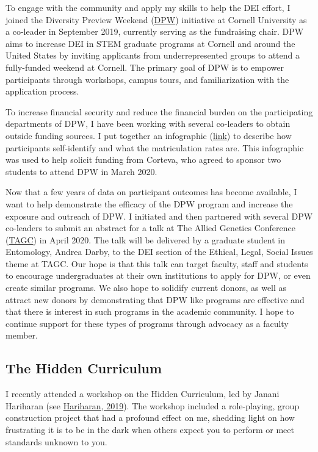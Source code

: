 \documentclass[11pt]{article}
\begin{document}
To engage with the community and apply my skills to help the DEI effort, I joined the Diversity Preview Weekend (\href{https://cornelldpw.org}{DPW}) initiative at Cornell University as a co-leader in September 2019, currently serving as the fundraising chair. DPW aims to increase DEI in STEM graduate programs at Cornell and around the United States by inviting applicants from underrepresented groups to attend a fully-funded weekend at Cornell. The primary goal of DPW is to empower participants through workshops, campus tours, and familiarization with the application process. 

To increase financial security and reduce the financial burden on the participating departments of DPW, I have been working with several co-leaders to obtain outside funding sources. I put together an infographic (\href{https://github.com/nsantantonio/DPWinfographic/blob/master/infoGraphic.pdf}{link}) to describe how participants self-identify and what the matriculation rates are. This infographic was used to help solicit funding from Corteva, who agreed to sponsor two students to attend DPW in March 2020. %

Now that a few years of data on participant outcomes has become available, I want to help demonstrate the efficacy of the DPW program and increase the exposure and outreach of DPW. I initiated and then partnered with several DPW co-leaders to submit an abstract for a talk at The Allied Genetics Conference (\href{https://genetics-gsa.org/tagc-2020/}{TAGC}) in April 2020. The talk will be delivered by a graduate student in Entomology, Andrea Darby, to the DEI section of the Ethical, Legal, Social Issues theme at TAGC. Our hope is that this talk can target faculty, staff and students to encourage undergraduates at their own institutions to apply for DPW, or even create similar programs. We also hope to solidify current donors, as well as attract new donors by demonstrating that DPW like programs are effective and that there is interest in such programs in the academic community. I hope to continue support for these types of programs through advocacy as a faculty member.  


\subsection*{The Hidden Curriculum}

I recently attended a workshop on the Hidden Curriculum, led by Janani Hariharan (see \href{https://science.sciencemag.org/content/364/6441/702.full}{Hariharan, 2019}). The workshop included a role-playing, group construction project that had a profound effect on me, shedding light on how frustrating it is to be in the dark when others expect you to perform or meet standards unknown to you. 
\end{document}
